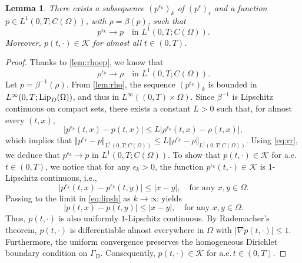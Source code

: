 \documentclass[final,reqno]{amsart}
\theoremstyle{plain}
\newtheorem{lemma}{Lemma}	%
\theoremstyle{definition}
\theoremstyle{remark}
\numberwithin{remark}{section}	%
\numberwithin{example}{section}	%
\newcommand{\K}{\mathcal K}
\newcommand{\pp}{a.e.\,}
\newcommand{\ie}{i.e.,\xspace}	%
\newcommand{\Lip}{\textup{Lip}}
\begin{document}
\begin{lemma}\label{lem:peps}
    There exists a subsequence $(p^{\epsilon_k})_{k}$ of $(p^{\epsilon})_{\epsilon}$ and a function $p \in L^1(0,T; C(\Omega))$, with $\rho=\beta(p)$, such that
    \begin{equation*}
        p^{\epsilon_k} \to p \quad \text{in } L^1(0,T; C(\Omega)).
    \end{equation*}
    Moreover, $p(t, \cdot) \in \K$ for almost all $t \in (0,T)$.
\end{lemma}
\begin{proof}

Thanks to \cref{lem:rhoep}, we know that 
    \begin{equation}\label{eq:rr}
        \rho^{\epsilon_k} \to \rho \quad \text{in } L^1(0,T; C(\Omega)).
    \end{equation}
    Let $p= \beta^{-1}(\rho)$. From \cref{lem:rho}, the sequence $(p^{\epsilon_k})_{k}$ is bounded in $L^\infty(0,T; \Lip_D(\Omega))$, and thus in $L^\infty((0,T)\times\Omega)$. Since $\beta^{-1}$ is Lipschitz continuous on compact sets, there exists a constant $L > 0$ such that, for almost every $(t,x)$, 
    \begin{equation}\label{eq:mg}
        \vert p^{\epsilon_k}(t,x) - p(t,x) \vert \leq L \vert \rho^{\epsilon_k}(t,x) - \rho(t,x) \vert,
    \end{equation}
    which implies that $\Vert p^{\epsilon_k} - p \Vert_{L^1(0,T; C(\Omega))} \leq L \Vert \rho^{\epsilon_k} - \rho \Vert_{L^1(0,T; C(\Omega))}$. Using \eqref{eq:rr}, we deduce that $p^{\epsilon_k} \to p$ in $L^1(0,T; C(\Omega))$.
    To show that $p(t, \cdot) \in \K$ for \pp $t\in (0,T)$, we notice that for any $\epsilon_k >0$, the function $p^{\epsilon_k}(t, \cdot) \in \K$ is $1$-Lipschitz continuous, \ie
        \begin{equation}\label{eq:lipsh}
        \vert p^{\epsilon_k}(t,x) - p^{\epsilon_k}(t,y) \vert \le \vert x-y \vert, \quad \text{for any } x, y \in \Omega.
    \end{equation}
    Passing to the limit in \eqref{eq:lipsh} as $k \to \infty$ yields
    \begin{equation*}
        \vert p(t,x) - p(t,y)\vert \le \vert x-y \vert, \quad \text{for any } x, y \in \Omega.
    \end{equation*}
    Thus, $p(t, \cdot)$ is also uniformly $1$-Lipschitz continuous. By Rademacher's theorem, $p(t, \cdot)$ is differentiable almost everywhere in $\Omega$ with $\vert \nabla p(t, \cdot) \vert \leq 1$. Furthermore, the uniform convergence preserves the homogeneous Dirichlet boundary condition on $\Gamma_D$. Consequently, $p(t, \cdot) \in \K$ for \pp $t\in (0,T)$.
\end{proof}
\end{document}
